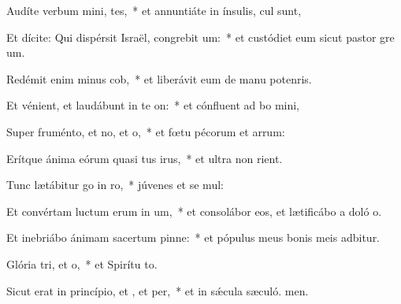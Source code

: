 \item Audíte verbum mini, tes,~* et annuntiáte in ínsulis,  cul sunt,
\item Et dícite: Qui dispérsit Israël, congrebit um:~* et custódiet eum sicut pastor gre um.
\item Redémit enim minus cob,~* et liberávit eum de manu potenris.
\item Et vénient, et laudábunt in te on:~* et cónfluent ad bo mini,
\item Super fruménto, et no, et o,~* et fœtu pécorum et arrum:
\item Erítque ánima eórum quasi tus irus,~* et ultra non rient.
\item Tunc lætábitur go in ro,~* júvenes et se mul:
\item Et convértam luctum erum in um,~* et consolábor eos, et lætificábo a doló o.
\item Et inebriábo ánimam sacertum pinne:~* et pópulus meus bonis meis adbitur.
\item Glória tri, et o,~* et Spirítu to.
\item Sicut erat in princípio, et , et per,~* et in sǽcula sæculó. men.
